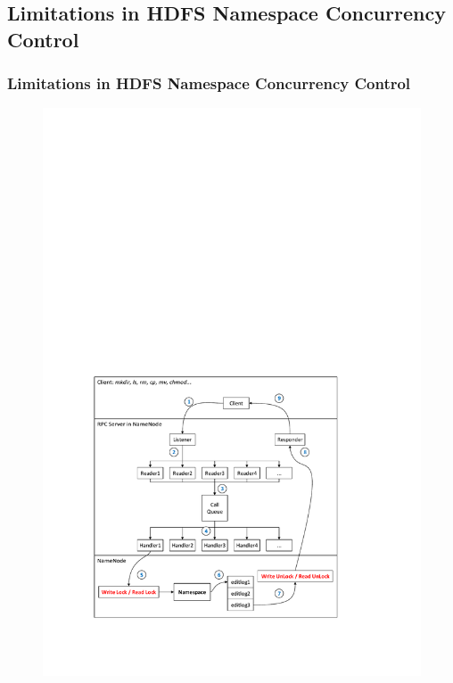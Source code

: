 \documentclass{beamer}
\begin{document}
\subsection{Limitations in HDFS Namespace Concurrency Control}
\begin{frame}
	\frametitle{Limitations in HDFS Namespace Concurrency Control}
		\begin{figure}[h]
			\centering
			\includegraphics[scale=0.4]{figs/nnRPC.pdf}
		\end{figure}
\end{frame}
\end{document}
